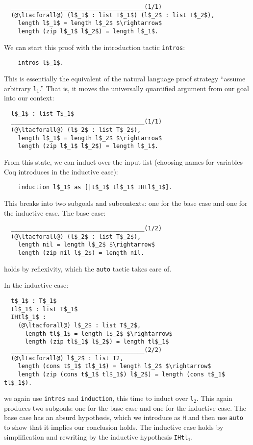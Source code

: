 \begin{lstlisting}
  ______________________________________(1/1)
  (@\ltacforall@) (l$_1$ : list T$_1$) (l$_2$ : list T$_2$),
    length l$_1$ = length l$_2$ $\rightarrow$
    length (zip l$_1$ l$_2$) = length l$_1$.
\end{lstlisting}
We can start this proof with the introduction tactic \lstinline{intros}:

\begin{lstlisting}
    intros l$_1$.
\end{lstlisting}
This is essentially the equivalent of the natural language proof strategy ``assume arbitrary \lstinline{l}$_1$.''
That is, it moves the universally quantified argument from our goal into our context:

\begin{lstlisting}
  l$_1$ : list T$_1$
  ______________________________________(1/1)
  (@\ltacforall@) (l$_2$ : list T$_2$),
    length l$_1$ = length l$_2$ $\rightarrow$
    length (zip l$_1$ l$_2$) = length l$_1$.
\end{lstlisting}
From this state, we can induct over the input list (choosing names for variables Coq introduces in the inductive case):

\begin{lstlisting}
    induction l$_1$ as [|t$_1$ tl$_1$ IHtl$_1$].
\end{lstlisting}
This breaks into two subgoals and subcontexts: one for the base case and one for the inductive case.
The base case:
\begin{lstlisting}
  ______________________________________(1/2)
  (@\ltacforall@) (l$_2$ : list T$_2$),
    length nil = length l$_2$ $\rightarrow$
    length (zip nil l$_2$) = length nil.
\end{lstlisting}
holds by reflexivity, which the \lstinline{auto} tactic takes care of.

In the inductive case:

\begin{lstlisting}
  t$_1$ : T$_1$
  tl$_1$ : list T$_1$
  IHtl$_1$ :
    (@\ltacforall@) l$_2$ : list T$_2$,
      length tl$_1$ = length l$_2$ $\rightarrow$
      length (zip tl$_1$ l$_2$) = length tl$_1$
  ______________________________________(2/2)
  (@\ltacforall@) l$_2$ : list T2,
    length (cons t$_1$ tl$_1$) = length l$_2$ $\rightarrow$
    length (zip (cons t$_1$ tl$_1$) l$_2$) = length (cons t$_1$ tl$_1$).
\end{lstlisting}
we again use \lstinline{intros} and \lstinline{induction}, this time to induct over \lstinline{l}$_2$.
This again produces two subgoals: one for the base case and one for the inductive case.
The base case has an absurd hypothesis, which we introduce as \lstinline{H} and then use \lstinline{auto} to show that it implies our conclusion holds.
The inductive case holds by simplification and rewriting by the inductive hypothesis \lstinline{IHtl}$_1$. %

